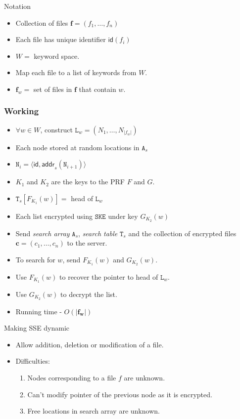 \documentclass{beamer}
\begin{document}
\begin{frame}{Notation}
\begin{itemize}
\item Collection of files \(\mathbf{f} = (f_1, \dotsc, f_n)\)
\item Each file has unique identifier \(\mathsf{id}(f_i)\)
\item \(W = \) keyword space.
\item Map each file to a list of keywords from \(W\).
\item \(\mathbf{f}_w =\) set of files in \(\mathbf{f}\) that contain
	\(w\).
\end{itemize}
\end{frame}

\begin{frame}[allowframebreaks]
\frametitle{Working}
\begin{itemize}
\item \(\forall w \in W\), construct
	\(\mathtt{L}_w = (N_1, \dotsc, N_{|f_w|})\)
\item Each node stored at random locations in \(\mathtt{A}_s\)
\item \(\mathtt{N}_i = \langle \mathsf{id, addr}_s(\mathtt{N}_{i+1}) \rangle\)
\item \(K_1\) and \(K_2\) are the keys to the PRF \(F\) and \(G\).
\item \(\mathtt{T}_s[F_{K_1}(w)] = \) head of \(\mathtt{L}_w\)
\item Each list encrypted using \(\mathtt{SKE}\) under key \(G_{K_2}(w)\)
	\framebreak
\item Send \emph{search array} \(\mathtt{A}_s\),
	\emph{search table} \(\mathtt{T}_s\) and
	the collection of encrypted files \(\mathbf{c} = (c_1, \dotsc, c_n)\)
	to the server.
\item To search for \(w\), send \(F_{K_1}(w)\) and \(G_{K_2}(w)\).
\item Use \(F_{K_1}(w)\) to recover the pointer to head of \(\mathtt{L}_w\).
\item Use \(G_{K_2}(w)\) to decrypt the list.
\item Running time - \(O(|\mathbf{f_w}|)\)
\end{itemize}
\end{frame}

\begin{frame}{Making SSE dynamic}
\begin{itemize}
\item Allow addition, deletion or modification of a file.
\item Difficulties:

\begin{enumerate}
\item Nodes corresponding to a file \(f\) are unknown.
\item Can't modify pointer of the previous node as it is encrypted.
\item Free locations in search array are unknown.
\end{enumerate}

\end{itemize}
\end{frame}
\end{document}
